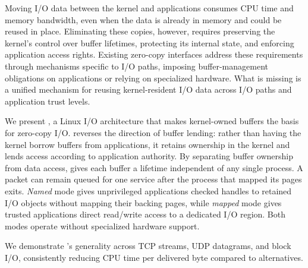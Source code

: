 Moving I/O data between the kernel and applications consumes CPU time and memory bandwidth, even when the data is already in memory and could be reused in place. Eliminating these copies, however, requires preserving the kernel’s control over buffer lifetimes, protecting its internal state, and enforcing application access rights. Existing zero-copy interfaces address these requirements through mechanisms specific to I/O paths, imposing buffer-management obligations on applications or relying on specialized hardware. What is missing is a unified mechanism for reusing kernel-resident I/O data across I/O paths and application trust levels.

We present \sys, a Linux I/O architecture that makes kernel-owned buffers the basis for zero-copy I/O.
\sys reverses the direction of buffer lending: rather than having the kernel borrow buffers from applications, it retains ownership in the kernel and lends access according to application authority.
By separating buffer ownership from data access, \sys gives each buffer a lifetime independent of any single process. A packet can remain queued for one service after the process that mapped its pages exits.
\emph{Named} mode gives unprivileged applications checked handles to retained I/O objects without mapping their backing pages, while \emph{mapped} mode gives trusted applications direct read/write access to a dedicated I/O region. Both modes operate without specialized hardware support.

We demonstrate \sys{}'s generality across TCP streams, UDP datagrams, and block I/O, consistently reducing CPU time per delivered byte compared to alternatives.
